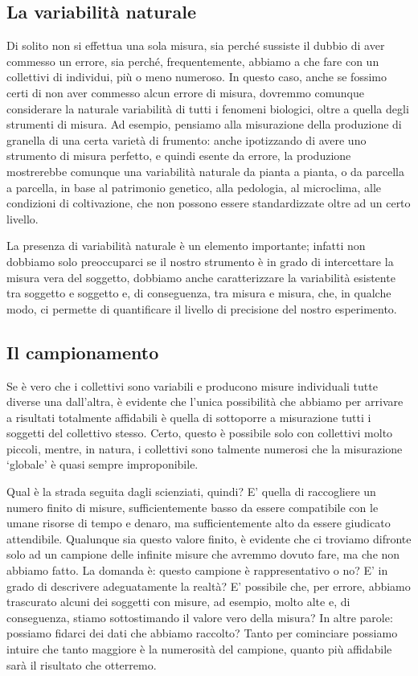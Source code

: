 \documentclass[a4paper,12pt,oneside]{book}
\begin{document}
\hypertarget{la-variabilita-naturale}{%
\subsection{La variabilità naturale}\label{la-variabilita-naturale}}

Di solito non si effettua una sola misura, sia perché sussiste il dubbio di aver commesso un errore, sia perché, frequentemente, abbiamo a che fare con un collettivi di individui, più o meno numeroso. In questo caso, anche se fossimo certi di non aver commesso alcun errore di misura, dovremmo comunque considerare la naturale variabilità di tutti i fenomeni biologici, oltre a quella degli strumenti di misura. Ad esempio, pensiamo alla misurazione della produzione di granella di una certa varietà di frumento: anche ipotizzando di avere uno strumento di misura perfetto, e quindi esente da errore, la produzione mostrerebbe comunque una variabilità naturale da pianta a pianta, o da parcella a parcella, in base al patrimonio genetico, alla pedologia, al microclima, alle condizioni di coltivazione, che non possono essere standardizzate oltre ad un certo livello.

La presenza di variabilità naturale è un elemento importante; infatti non dobbiamo solo preoccuparci se il nostro strumento è in grado di intercettare la misura vera del soggetto, dobbiamo anche caratterizzare la variabilità esistente tra soggetto e soggetto e, di conseguenza, tra misura e misura, che, in qualche modo, ci permette di quantificare il livello di precisione del nostro esperimento.

\hypertarget{il-campionamento}{%
\subsection{Il campionamento}\label{il-campionamento}}

Se è vero che i collettivi sono variabili e producono misure individuali tutte diverse una dall'altra, è evidente che l'unica possibilità che abbiamo per arrivare a risultati totalmente affidabili è quella di sottoporre a misurazione tutti i soggetti del collettivo stesso. Certo, questo è possibile solo con collettivi molto piccoli, mentre, in natura, i collettivi sono talmente numerosi che la misurazione `globale' è quasi sempre improponibile.

Qual è la strada seguita dagli scienziati, quindi? E' quella di raccogliere un numero finito di misure, sufficientemente basso da essere compatibile con le umane risorse di tempo e denaro, ma sufficientemente alto da essere giudicato attendibile. Qualunque sia questo valore finito, è evidente che ci troviamo difronte solo ad un campione delle infinite misure che avremmo dovuto fare, ma che non abbiamo fatto. La domanda è: questo campione è rappresentativo o no? E' in grado di descrivere adeguatamente la realtà? E' possibile che, per errore, abbiamo trascurato alcuni dei soggetti con misure, ad esempio, molto alte e, di conseguenza, stiamo sottostimando il valore vero della misura? In altre parole: possiamo fidarci dei dati che abbiamo raccolto? Tanto per cominciare possiamo intuire che tanto maggiore è la numerosità del campione, quanto più affidabile sarà il risultato che otterremo.
\end{document}
